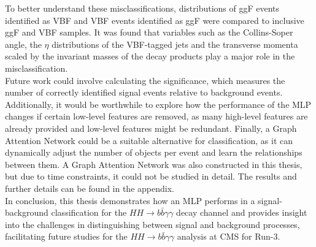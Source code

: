 To better understand these misclassifications, distributions of ggF events identified as VBF and VBF events identified as ggF were compared to inclusive ggF and VBF samples. It was found that variables
such as the Collins-Soper angle, the $\eta$ distributions of the VBF-tagged jets and the transverse momenta scaled by the invariant masses of the decay products play a major role in the misclassification. \\

Future work could involve calculating the significance, which measures the number of correctly identified signal events relative to background events. Additionally, it would be worthwhile to explore how the
performance of the MLP changes if certain low-level features are removed, as many high-level features are already provided and low-level features might be redundant. Finally, a Graph Attention Network could be
a suitable alternative for classification, as it can dynamically adjust the number of objects per event and learn the relationships between them. A Graph Attention Network was also constructed in this thesis,
but due to time constraints, it could not be studied in detail. The results and further details can be found in the appendix. \\

In conclusion, this thesis demonstrates how an MLP performs in a signal-background classification for the $HH \rightarrow b \bar{b} \gamma \gamma$ decay channel and provides insight into the challenges in
distinguishing between signal and background processes, facilitating future studies for the $HH \rightarrow b \bar{b} \gamma \gamma$ analysis at CMS for Run-3. \\
